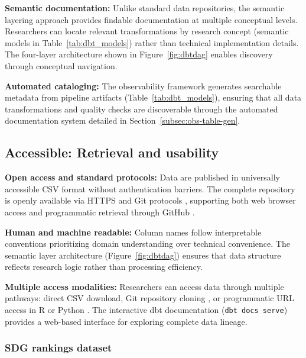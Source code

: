 \documentclass{article}
\begin{document}
\textbf{Semantic documentation:} Unlike standard data repositories, the semantic layering approach provides findable documentation at multiple conceptual levels. Researchers can locate relevant transformations by research concept (semantic models in Table~\ref{tab:dbt_models}) rather than technical implementation details. The four-layer architecture shown in Figure~\ref{fig:dbtdag} enables discovery through conceptual navigation.

\textbf{Automated cataloging:} The observability framework generates searchable metadata from pipeline artifacts (Table~\ref{tab:dbt_models}), ensuring that all data transformations and quality checks are discoverable through the automated documentation system detailed in Section~\ref{subsec:obs-table-gen}.

\subsection{Accessible: Retrieval and usability}

\textbf{Open access and standard protocols:} Data are published in universally accessible CSV format \cite{csv_rfc} without authentication barriers. The complete repository is openly available via HTTPS and Git protocols \cite{git}, supporting both web browser access and programmatic retrieval through GitHub \cite{github}.

\textbf{Human and machine readable:} Column names follow interpretable conventions prioritizing domain understanding over technical convenience. The semantic layer architecture (Figure~\ref{fig:dbtdag}) ensures that data structure reflects research logic rather than processing efficiency.

\textbf{Multiple access modalities:} Researchers can access data through multiple pathways: direct CSV download, Git repository cloning \cite{git}, or programmatic URL access in R \cite{r_core} or Python \cite{python}. The interactive dbt documentation (\texttt{dbt docs serve}) \cite{dbt_core} provides a web-based interface for exploring complete data lineage.

\subsubsection{SDG rankings dataset}
\end{document}
